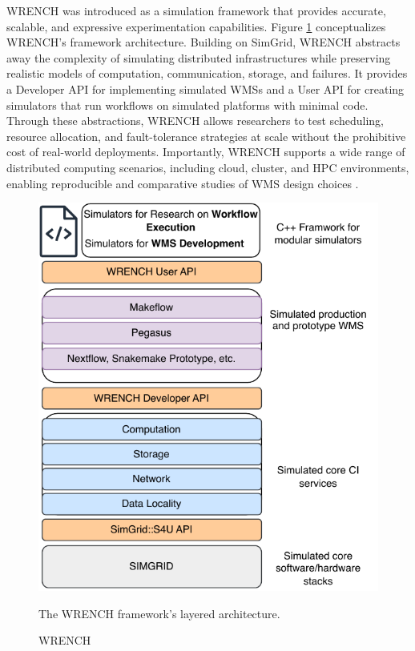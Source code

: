WRENCH was introduced as a simulation framework that provides accurate, scalable, and expressive experimentation capabilities. Figure \ref{fig:02-wrench} conceptualizes WRENCH's framework architecture. Building on SimGrid, WRENCH abstracts away the complexity of simulating distributed infrastructures while preserving realistic models of computation, communication, storage, and failures. It provides a Developer API for implementing simulated WMSs and a User API for creating simulators that run workflows on simulated platforms with minimal code. Through these abstractions, WRENCH allows researchers to test scheduling, resource allocation, and fault-tolerance strategies at scale without the prohibitive cost of real-world deployments. Importantly, WRENCH supports a wide range of distributed computing scenarios, including cloud, cluster, and HPC environments, enabling reproducible and comparative studies of WMS design choices \cite{wrench}.

\begin{figure}[H]
    \centering
    \includegraphics[scale=0.7]{fig/02/02-wrench.pdf}
    \small
    \caption{WRENCH}
    \label{fig:02-wrench}
    \tiny
    The WRENCH framework's layered architecture.
\end{figure}





